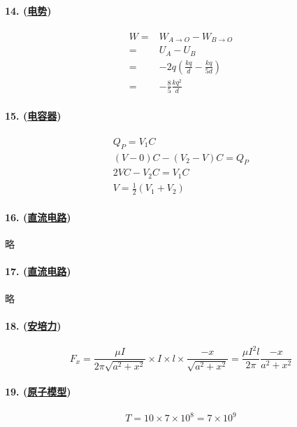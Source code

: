 \paragraph{14. (\hyperref[subsec:电势]{电势})}

\begin{align*}
    W=&W_{A\to O}-W_{B\to O}\\
    =&U_A-U_B\\
    =&-2q\left(\frac{kq}{d}-\frac{kq}{5d}\right)\\
    =&-\frac85\frac{kq^2}{d}
\end{align*}

\paragraph{15. (\hyperref[subsec:电容器]{电容器})}

\begin{gather*}
    Q_P=V_1C\\
    (V-0)C-(V_2-V)C=Q_P\\
    2VC-V_2C=V_1C\\
    V=\frac12(V_1+V_2)
\end{gather*}

\paragraph{16. (\hyperref[subsec:直流电路]{直流电路})} 略
\paragraph{17. (\hyperref[subsec:直流电路]{直流电路})} 略
\paragraph{18. (\hyperref[subsec:安培力]{安培力})}

\begin{equation*}
    F_x=\frac{\mu I}{2\pi\sqrt{a^2+x^2}}\times I\times l\times\frac{-x}{\sqrt{a^2+x^2}}=\frac{\mu I^2l}{2\pi}\frac{-x}{a^2+x^2}
\end{equation*}

\paragraph{19. (\hyperref[sec:原子模型]{原子模型})}

\begin{equation*}
    T=10\times7\times10^8=7\times10^9
\end{equation*}

